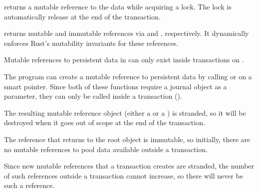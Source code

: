  returns a mutable reference to the data while
acquiring a lock.  The lock is automatically release at the end of the
transaction.

 returns mutable and immutable references via
 and ,
respectively.  It dynamically enforces Rust's mutability
invariants for these references.


\begin{invar}
  \label{inv:mutable-in-tx-only}
  Mutable references to persistent data in  can only exist inside transactions on .
\end{invar}

\begin{discuss}
  The program can create a mutable reference to persistent data by calling
   or  on a smart pointer.  Since both of
  these functions require a journal object as a parameter, they can only be called inside a
  transaction ().

  The resulting mutable reference object (either a  or a
  ) is stranded, so it will be destroyed when it goes out of
  scope at the end of the transaction.
  
  The reference that  returns to the root object is immutable, so
  initially, there are no mutable references to pool data available outside a
  transaction.

  Since new mutable references that a transaction creates are stranded, the
  number of such references outside a transaction cannot increase, so there
  will never be such a reference.
\end{discuss}

